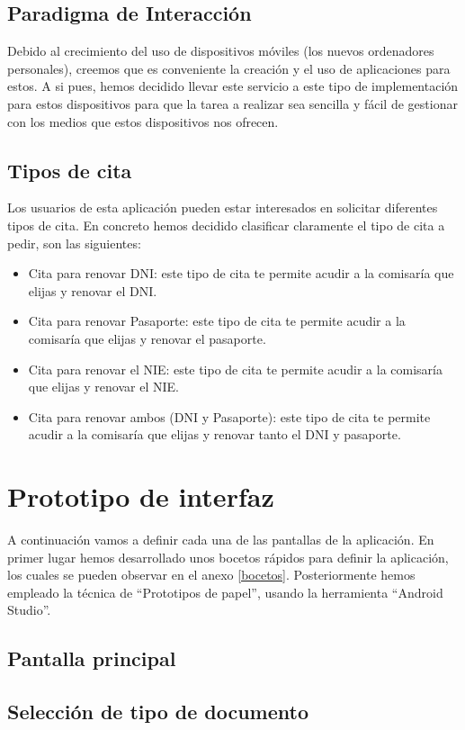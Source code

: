 \documentclass[a4paper,11pt]{article}
\begin{document}
\subsection{Paradigma de Interacción}
Debido al crecimiento del uso de dispositivos móviles (los nuevos ordenadores personales), creemos que es conveniente la creación y el uso de aplicaciones para estos. A si pues, hemos decidido llevar este servicio a este tipo de implementación para estos dispositivos para que la tarea a realizar sea sencilla y fácil de gestionar con los medios que estos dispositivos nos ofrecen.

\subsection{Tipos de cita}
Los usuarios de esta aplicación pueden estar interesados en solicitar diferentes tipos de cita. En concreto hemos decidido clasificar claramente el tipo de cita a pedir, son las siguientes:

\begin{itemize}
  \item Cita para renovar DNI: este tipo de cita te permite acudir a la comisaría que elijas y renovar el DNI.
  \item Cita para renovar Pasaporte: este tipo de cita te permite acudir a la comisaría que elijas y renovar el pasaporte.
  \item Cita para renovar el NIE: este tipo de cita te permite acudir a la comisaría que elijas y renovar el NIE.
  \item Cita para renovar ambos (DNI y Pasaporte): este tipo de cita te permite acudir a la comisaría que elijas y renovar tanto el DNI y pasaporte.
\end{itemize}

\section{Prototipo de interfaz}
A continuación vamos a definir cada una de las pantallas de la aplicación. En primer lugar hemos desarrollado unos bocetos rápidos para definir la aplicación, los cuales se pueden observar en el anexo \ref{bocetos}. Posteriormente hemos empleado la técnica de “Prototipos de papel”, usando la herramienta “Android Studio”.

\subsection{Pantalla principal}
\subsection{Selección de tipo de documento}
\end{document}
